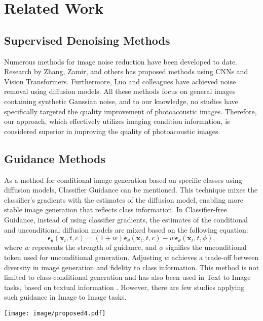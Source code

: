 \section{Related Work}
\label{sec:relatedwork}
\subsection{Supervised Denoising Methods}
Numerous methods for image noise reduction have been developed to date. Research by Zhang, Zamir, and others has proposed methods using CNNs and Vision Transformers. Furthermore, Luo and colleagues have achieved noise removal using diffusion models. All these methods focus on general images containing synthetic Gaussian noise, and to our knowledge, no studies have specifically targeted the quality improvement of photoacoustic images. Therefore, our approach, which effectively utilizes imaging condition information, is considered superior in improving the quality of photoacoustic images.

\subsection{Guidance Methods}

As a method for conditional image generation based on specific classes using diffusion models, Classifier Guidance\cite{dhariwal2021diffusion} can be mentioned. This technique mixes the classifier's gradients with the estimates of the diffusion model, enabling more stable image generation that reflects class information. In Classifier-free Guidance\cite{ho2021classifierfree}, instead of using classifier gradients, the estimates of the conditional and unconditional diffusion models are mixed based on the following equation:
\begin{equation}
    \tilde{\bm{\epsilon}}_\theta(\bm{x}_t,t,c) = (1+w)\bm{\epsilon}_\theta(\bm{x}_t,t,c) - w\bm{\epsilon}_\theta(\bm{x}_t,t,\phi),
    \label{eq:cfg}
\end{equation}
where $w$ represents the strength of guidance, and $\phi$ signifies the unconditional token used for unconditional generation. Adjusting $w$ achieves a trade-off between diversity in image generation and fidelity to class information. This method is not limited to class-conditional generation and has also been used in Text to Image tasks, based on textual information \cite{rombach2022high}. However, there are few studies applying such guidance in Image to Image tasks.

\begin{figure*}[t]
    \centering
    \texttt{[image: image/proposed4.pdf]}
    \caption{}
    \label{fig:proposed}
\end{figure*}